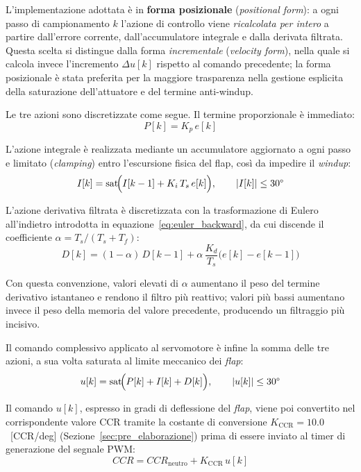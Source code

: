 \documentclass[11pt]{report}
\begin{document}
L'implementazione adottata è in \textbf{forma posizionale} (\textit{positional form}): a ogni passo di campionamento $k$ l'azione di controllo viene \textit{ricalcolata per intero} a partire dall'errore corrente, dall'accumulatore integrale e dalla derivata filtrata. Questa scelta si distingue dalla forma \textit{incrementale} (\textit{velocity form}), nella quale si calcola invece l'incremento $\Delta u[k]$ rispetto al comando precedente; la forma posizionale è stata preferita per la maggiore trasparenza nella gestione esplicita della saturazione dell'attuatore e del termine anti-windup.

Le tre azioni sono discretizzate come segue. Il termine proporzionale è immediato:
\begin{equation}
	P[k] = K_p \, e[k]
	\label{eq:pid_p}
\end{equation}

L'azione integrale è realizzata mediante un accumulatore aggiornato a ogni passo e limitato (\textit{clamping}) entro l'escursione fisica del flap, così da impedire il \textit{windup}:
\begin{equation}
	I[k] = \mathrm{sat}\!\Bigl( I[k-1] + K_i \, T_s \, e[k] \Bigr), 
	\qquad |I[k]| \leq 30\degree
	\label{eq:pid_i}
\end{equation}

L'azione derivativa filtrata è discretizzata con la trasformazione di Eulero all'indietro introdotta in equazione~\eqref{eq:euler_backward}, da cui discende il coefficiente $\alpha = T_s/(T_s + T_f)$:
\begin{equation}
	D[k] = (1-\alpha)\, D[k-1] + \alpha \, \frac{K_d}{T_s} \bigl( e[k] - e[k-1] \bigr)
	\label{eq:pid_d}
\end{equation}

Con questa convenzione, valori elevati di $\alpha$ aumentano il peso del termine derivativo istantaneo e rendono il filtro più reattivo; valori più bassi aumentano invece il peso della memoria del valore precedente, producendo un filtraggio più incisivo.

Il comando complessivo applicato al servomotore è infine la somma delle tre azioni, a sua volta saturata al limite meccanico dei \textit{flap}:
\begin{equation}
	u[k] = \mathrm{sat}\!\Bigl( P[k] + I[k] + D[k] \Bigr),
	\qquad |u[k]| \leq 30\degree
	\label{eq:pid_posizionale}
\end{equation}

Il comando $u[k]$, espresso in gradi di deflessione del \textit{flap}, viene poi convertito nel corrispondente valore CCR tramite la costante di conversione $K_\text{CCR} = 10.0$~[CCR/deg] (Sezione~\ref{sec:pre_elaborazione}) prima di essere inviato al timer di generazione del segnale PWM:
\begin{equation}
	CCR = CCR_\text{neutro} + K_\text{CCR} \, u[k]
	\label{eq:conversione_ccr_pid}
\end{equation}
\end{document}
